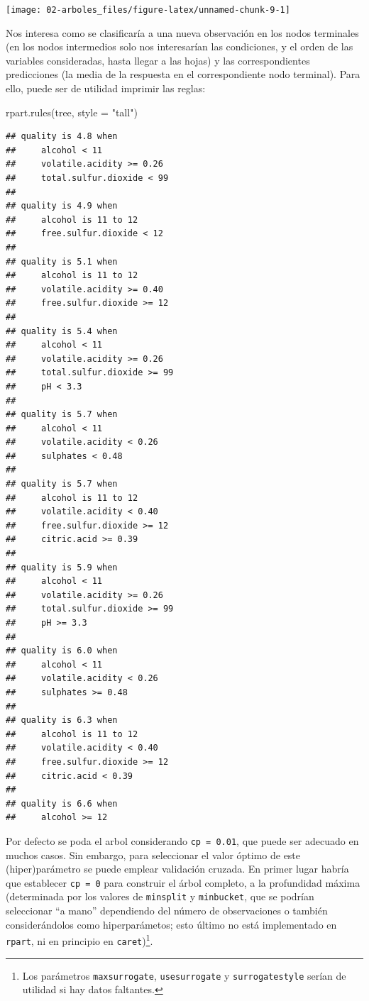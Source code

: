 \documentclass[
  spanish,
]{book}
\newenvironment{Shaded}{\begin{snugshade}}{\end{snugshade}}
\newcommand{\AttributeTok}[1]{\textcolor[rgb]{0.77,0.63,0.00}{#1}}
\newcommand{\FunctionTok}[1]{\textcolor[rgb]{0.00,0.00,0.00}{#1}}
\newcommand{\NormalTok}[1]{#1}
\newcommand{\StringTok}[1]{\textcolor[rgb]{0.31,0.60,0.02}{#1}}
\theoremstyle{break}
\theoremstyle{definition}
\theoremstyle{definition}
\theoremstyle{definition}
\theoremstyle{definition}
\theoremstyle{remark}
\begin{document}
\begin{center}\texttt{[image: 02-arboles\_files/figure-latex/unnamed-chunk-9-1]} \end{center}

Nos interesa como se clasificaría a una nueva observación en los nodos terminales (en los nodos intermedios solo nos interesarían las condiciones, y el orden de las variables consideradas, hasta llegar a las hojas) y las correspondientes predicciones (la media de la respuesta en el correspondiente nodo terminal).
Para ello, puede ser de utilidad imprimir las reglas:

\begin{Shaded}
\begin{Highlighting}[]
\FunctionTok{rpart.rules}\NormalTok{(tree, }\AttributeTok{style =} \StringTok{"tall"}\NormalTok{)}
\end{Highlighting}
\end{Shaded}

\begin{verbatim}
## quality is 4.8 when
##     alcohol < 11
##     volatile.acidity >= 0.26
##     total.sulfur.dioxide < 99
## 
## quality is 4.9 when
##     alcohol is 11 to 12
##     free.sulfur.dioxide < 12
## 
## quality is 5.1 when
##     alcohol is 11 to 12
##     volatile.acidity >= 0.40
##     free.sulfur.dioxide >= 12
## 
## quality is 5.4 when
##     alcohol < 11
##     volatile.acidity >= 0.26
##     total.sulfur.dioxide >= 99
##     pH < 3.3
## 
## quality is 5.7 when
##     alcohol < 11
##     volatile.acidity < 0.26
##     sulphates < 0.48
## 
## quality is 5.7 when
##     alcohol is 11 to 12
##     volatile.acidity < 0.40
##     free.sulfur.dioxide >= 12
##     citric.acid >= 0.39
## 
## quality is 5.9 when
##     alcohol < 11
##     volatile.acidity >= 0.26
##     total.sulfur.dioxide >= 99
##     pH >= 3.3
## 
## quality is 6.0 when
##     alcohol < 11
##     volatile.acidity < 0.26
##     sulphates >= 0.48
## 
## quality is 6.3 when
##     alcohol is 11 to 12
##     volatile.acidity < 0.40
##     free.sulfur.dioxide >= 12
##     citric.acid < 0.39
## 
## quality is 6.6 when
##     alcohol >= 12
\end{verbatim}

Por defecto se poda el arbol considerando \texttt{cp\ =\ 0.01}, que puede ser adecuado en muchos casos.
Sin embargo, para seleccionar el valor óptimo de este (hiper)parámetro se puede emplear validación cruzada.
En primer lugar habría que establecer \texttt{cp\ =\ 0} para construir el árbol completo, a la profundidad máxima
(determinada por los valores de \texttt{minsplit} y \texttt{minbucket}, que se podrían seleccionar
``a mano'' dependiendo del número de observaciones o también considerándolos como hiperparámetos; esto último no está implementado en \texttt{rpart}, ni en principio en \texttt{caret})\footnote{Los parámetros \texttt{maxsurrogate}, \texttt{usesurrogate} y \texttt{surrogatestyle} serían de utilidad si hay datos faltantes.}.
\end{document}
